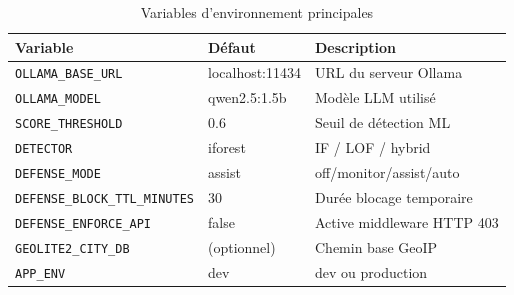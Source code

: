 \documentclass[12pt,a4paper]{report}
\begin{document}
\begin{table}[H]
\centering
\caption{Variables d'environnement principales}
\label{tab:env_vars}
\begin{tabular}{|p{5.5cm}|p{3cm}|p{5cm}|}
\hline
\textbf{Variable} & \textbf{Défaut} & \textbf{Description} \\
\hline
\texttt{OLLAMA\_BASE\_URL} & localhost:11434 & URL du serveur Ollama \\
\hline
\texttt{OLLAMA\_MODEL} & qwen2.5:1.5b & Modèle LLM utilisé \\
\hline
\texttt{SCORE\_THRESHOLD} & 0.6 & Seuil de détection ML \\
\hline
\texttt{DETECTOR} & iforest & IF / LOF / hybrid \\
\hline
\texttt{DEFENSE\_MODE} & assist & off/monitor/assist/auto \\
\hline
\texttt{DEFENSE\_BLOCK\_TTL\_MINUTES} & 30 & Durée blocage temporaire \\
\hline
\texttt{DEFENSE\_ENFORCE\_API} & false & Active middleware HTTP 403 \\
\hline
\texttt{GEOLITE2\_CITY\_DB} & (optionnel) & Chemin base GeoIP \\
\hline
\texttt{APP\_ENV} & dev & dev ou production \\
\hline
\end{tabular}
\end{table}
\end{document}
